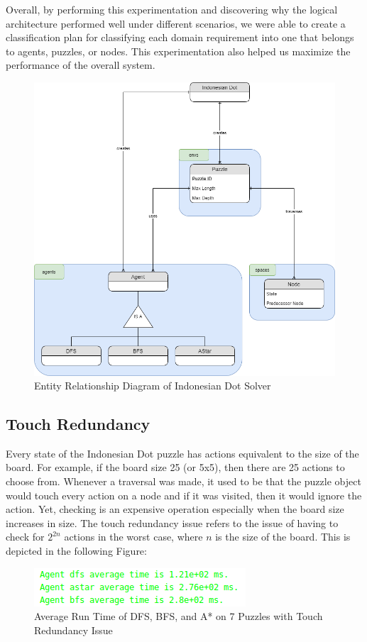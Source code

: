 Overall, by performing this experimentation and discovering why the logical architecture performed well under different scenarios, we were able to create a classification plan for classifying each domain requirement into one that belongs to agents, puzzles, or nodes. This experimentation also helped us maximize the performance of the overall system.

\begin{figure}[H]
\includegraphics[width=0.75\linewidth]{assets/schema.png}
\caption{Entity Relationship Diagram of Indonesian Dot Solver} \label{fig2}
\end{figure}

\subsection{Touch Redundancy}

Every state of the Indonesian Dot puzzle has actions equivalent to the size of the board. For example, if the board size 25 (or 5x5), then there are 25 actions to choose from. Whenever a traversal was made, it used to be that the puzzle object would touch every action on a node and if it was visited, then it would ignore the action. Yet, checking is an expensive operation especially when the board size increases in size. The touch redundancy issue refers to the issue of having to check for $2^{2n}$ actions in the worst case, where $n$ is the size of the board. This is depicted in the following Figure: 

\begin{figure}[H]
\includegraphics[width=0.75\linewidth]{assets/touch_redundancy.png}
\caption{Average Run Time of DFS, BFS, and A* on 7 Puzzles with Touch Redundancy Issue} \label{fig3}
\end{figure}

